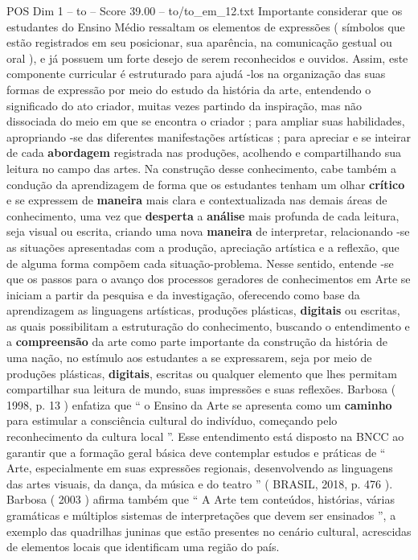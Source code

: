\begin{textsample}{POS Dim 1 – to – Score 39.00 – to/to\_em\_12.txt}
Importante considerar que os estudantes do Ensino Médio ressaltam os elementos de expressões ( símbolos que estão registrados em seu posicionar, sua aparência, na comunicação gestual ou oral ), e já possuem um forte desejo de serem reconhecidos e ouvidos.
Assim, este componente curricular é estruturado para ajudá -los na organização das suas formas de expressão por meio do estudo da história da arte, entendendo o significado do ato criador, muitas vezes partindo da inspiração, mas não dissociada do meio em que se encontra o criador ; para ampliar suas habilidades, apropriando -se das diferentes manifestações artísticas ; para apreciar e se inteirar de cada \textbf{abordagem} registrada nas produções, acolhendo e compartilhando sua leitura no campo das artes.
Na construção desse conhecimento, cabe também a condução da aprendizagem de forma que os estudantes tenham um olhar \textbf{crítico} e se expressem de \textbf{maneira} mais clara e contextualizada nas demais áreas de conhecimento, uma vez que \textbf{desperta} a \textbf{análise} mais profunda de cada leitura, seja visual ou escrita, criando uma nova \textbf{maneira} de interpretar, relacionando -se as situações apresentadas com a produção, apreciação artística e a reflexão, que de alguma forma compõem cada situação-problema.
Nesse sentido, entende -se que os passos para o avanço dos processos geradores de conhecimentos em Arte se iniciam a partir da pesquisa e da investigação, oferecendo como base da aprendizagem as linguagens artísticas, produções plásticas, \textbf{digitais} ou escritas, as quais possibilitam a estruturação do conhecimento, buscando o entendimento e a \textbf{compreensão} da arte como parte importante da construção da história de uma nação, no estímulo aos estudantes a se expressarem, seja por meio de produções plásticas, \textbf{digitais}, escritas ou qualquer elemento que lhes permitam compartilhar sua leitura de mundo, suas impressões e suas reflexões.
Barbosa ( 1998, p. 13 ) enfatiza que “ o Ensino da Arte se apresenta como um \textbf{caminho} para estimular a consciência cultural do indivíduo, começando pelo reconhecimento da cultura local ”.
Esse entendimento está disposto na BNCC ao garantir que a formação geral básica deve contemplar estudos e práticas de “ Arte, especialmente em suas expressões regionais, desenvolvendo as linguagens das artes visuais, da dança, da música e do teatro ” ( BRASIL, 2018, p. 476 ).
Barbosa ( 2003 ) afirma também que “ A Arte tem conteúdos, histórias, várias gramáticas e múltiplos sistemas de interpretações que devem ser ensinados ”, a exemplo das quadrilhas juninas que estão presentes no cenário cultural, acrescidas de elementos locais que identificam uma região do país.

\end{textsample}
